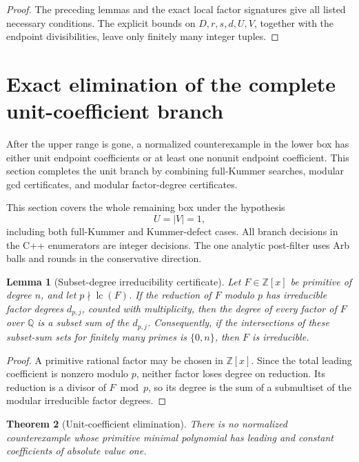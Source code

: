 \documentclass[11pt]{article}
\numberwithin{equation}{section}
\newtheorem{theorem}{Theorem}[section]
\newtheorem{lemma}[theorem]{Lemma}
\theoremstyle{definition}
\newcommand{\Q}{\mathbb Q}
\newcommand{\Z}{\mathbb Z}
\begin{document}
\begin{proof}
The preceding lemmas and the exact local factor signatures give all listed
necessary conditions.  The explicit bounds on \(D,r,s,d,U,V\), together
with the endpoint divisibilities, leave only finitely many integer tuples.
\end{proof}

\section{Exact elimination of the complete unit-coefficient branch}
\label{sec:unitlowercomputation}

After the upper range is gone, a normalized counterexample in the lower box has either unit endpoint coefficients or at least one nonunit endpoint coefficient.  This section completes the unit branch by combining full-Kummer searches, modular gcd certificates, and modular factor-degree certificates.

This section covers the whole
remaining box under the hypothesis
\[
 U=|V|=1,
\]
including both full-Kummer and Kummer-defect cases.  All branch decisions in
the C++ enumerators are integer decisions.  The one analytic post-filter uses
Arb balls and rounds in the conservative direction.

\begin{lemma}[Subset-degree irreducibility certificate]
\label{lem:subsetdegreecertificate}
Let \(F\in\Z[x]\) be primitive of degree \(n\), and let
\(p\nmid\operatorname{lc}(F)\).  If the reduction of \(F\) modulo \(p\)
has irreducible factor degrees \(d_{p,j}\), counted with multiplicity, then
the degree of every factor of \(F\) over \(\Q\) is a subset sum of the
\(d_{p,j}\).  Consequently, if the intersections of these subset-sum sets
for finitely many primes is \(\{0,n\}\), then \(F\) is irreducible.
\end{lemma}

\begin{proof}
A primitive rational factor may be chosen in \(\Z[x]\).  Since the total
leading coefficient is nonzero modulo \(p\), neither factor loses degree on
reduction.  Its reduction is a divisor of \(F\bmod p\), so its degree is the
sum of a submultiset of the modular irreducible factor degrees.
\end{proof}

\begin{theorem}[Unit-coefficient elimination]\label{thm:unitelimination}
There is no normalized counterexample whose primitive minimal polynomial has
leading and constant coefficients of absolute value one.
\end{theorem}
\end{document}

